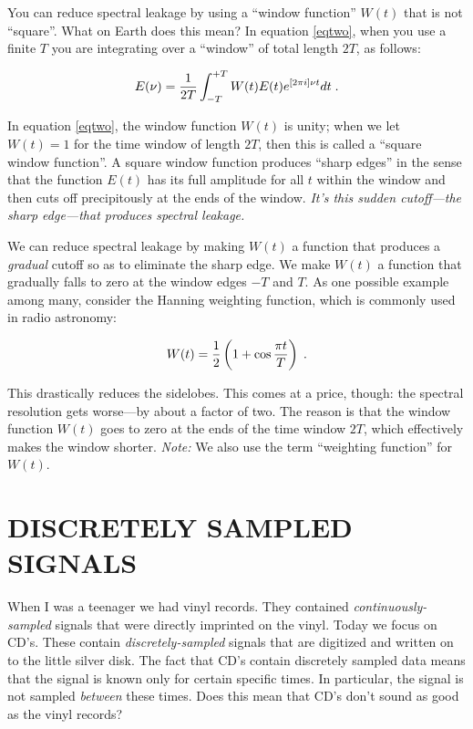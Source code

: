 \documentclass[psfig,preprint]{aastex}
\begin{document}
        You can reduce spectral leakage by using a ``window function''
$W(t)$ that is not ``square''.  What on Earth does this mean? In equation
\ref{eqtwo}, when you use a finite $T$ you are integrating over a    
``window'' of total length $2T$, as follows:

\begin{equation}
E(\nu) = {1 \over 2T}
\int_{-T}^{+T} W(t) E(t) e^{[2 \pi i]\nu t}  dt \; .
\end{equation}

\noindent In equation \ref{eqtwo}, the window function $W(t)$ is unity;
when  we let $W(t) = 1$ for the time window of length $2T$, then this is
called a ``square window function''.  A square window function produces 
``sharp edges'' in the sense that the function $E(t)$ has its full
amplitude for all $t$ within the window and then cuts off precipitously
at the ends of the window.  {\it It's this sudden cutoff---the sharp
edge---that produces spectral leakage.}

        We can reduce spectral leakage by making $W(t)$ a function that
produces a {\it gradual} cutoff so as to eliminate the sharp edge.  We
make $W(t)$ a function that gradually falls to zero at the window edges
$-T$ and $T$. As one possible example among many, consider the Hanning
weighting function, which is commonly used in radio astronomy:

\begin{equation}
W(t) = {1 \over 2} \left( 1 + \cos{\pi t \over T} \right) \; .
\label{weighting}
\end{equation}

\noindent This drastically reduces the sidelobes.  This comes at a
price, though: the spectral resolution gets worse---by about a factor
of two.  The reason is that the window function $W(t)$ goes to zero
at the ends of the time window $2T$, which effectively makes the window
shorter. {\it Note:} We also use the term ``weighting function'' for
$W(t)$.



\section{DISCRETELY SAMPLED SIGNALS}

	When I was a teenager we had vinyl records.  They contained {\it
continuously-sampled} signals that were directly imprinted on the vinyl. 
Today we focus on CD's.  These contain {\it discretely-sampled} signals
that are digitized and written on to the little silver disk.  The fact
that CD's contain discretely sampled data means that the signal is known
only for certain specific times.  In particular, the signal is not
sampled {\it between} these times.  Does this mean that CD's don't sound
as good as the vinyl records?
\end{document}
